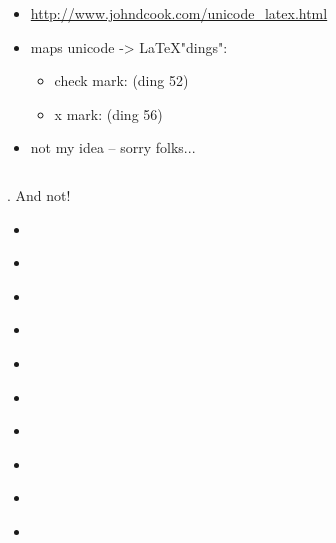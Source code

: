{
\begin{itemize}
\item \url{http://www.johndcook.com/unicode\_latex.html}
\item maps unicode -> \LaTeX "dings":
\begin{itemize}
\item check mark:  (ding 52)
\item x mark:  (ding 56)
\end{itemize}
\item not my idea -- sorry folks...
\end{itemize}

\begin{columns}

\begin{column}{0.45\textwidth}
\begin{center}
\color{red}
\fontsize{60}{70}\selectfont
{}
\end{center}
\end{column}

\begin{column}{0.45\textwidth}
\begin{center}
\color{green}
\fontsize{60}{70}\selectfont
{}
\end{center}
\end{column}

\end{columns}
}


{
{  }
{  }
{  }
{  }
{ . }
And not!

\vspace{2em}
\begin{itemize}
  \item {  }
  \item {  }
  \item {  }
  \item {  }
  \item {  }
  \item {  }
  \item {  }
  \item {  }
  \item {  }
  \item {  }
\end{itemize}
}
